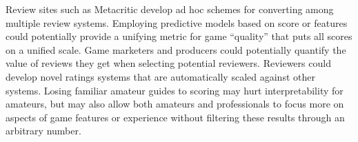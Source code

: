 \documentclass[letterpaper]{article}
\begin{document}
Review sites such as Metacritic develop ad hoc schemes for converting among multiple review systems. Employing predictive models based on score or features could potentially provide a unifying metric for game ``quality'' that puts all scores on a unified scale. Game marketers and producers could potentially quantify the value of reviews they get when selecting potential reviewers. Reviewers could develop novel ratings systems that are automatically scaled against other systems. Losing familiar amateur guides to scoring may hurt interpretability for amateurs, but may also allow both amateurs and professionals to focus more on aspects of game features or experience without filtering these results through an arbitrary number.


\end{document}
